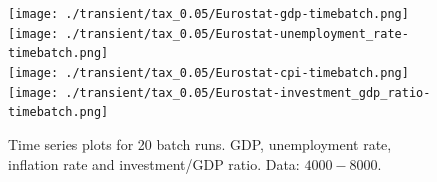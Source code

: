 
\begin{figure}[ht!]
\centering\leavevmode
\begin{minipage}{17cm}
\centering\leavevmode
\texttt{[image: ./transient/tax\_0.05/Eurostat-gdp-timebatch.png]}
\texttt{[image: ./transient/tax\_0.05/Eurostat-unemployment\_rate-timebatch.png]}\\
\texttt{[image: ./transient/tax\_0.05/Eurostat-cpi-timebatch.png]}
\texttt{[image: ./transient/tax\_0.05/Eurostat-investment\_gdp\_ratio-timebatch.png]}
\end{minipage}
\caption{Time series plots for 20 batch runs. GDP, unemployment rate, inflation rate and investment/GDP ratio. Data: $4000-8000$.}
\label{Figure: transient time}
\end{figure}


